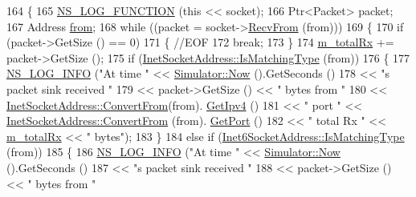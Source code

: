 \begin{DoxyCode}
164 \{
165   \hyperlink{log-macros-disabled_8h_a90b90d5bad1f39cb1b64923ea94c0761}{NS\_LOG\_FUNCTION} (\textcolor{keyword}{this} << socket);
166   Ptr<Packet> packet;
167   Address \hyperlink{lte__amc_8m_a1b4c81ff74eb1a626b5ade44c81004b3}{from};
168   \textcolor{keywordflow}{while} ((packet = socket->\hyperlink{classns3_1_1Socket_af22378d7af9a2745a9eada20210da215}{RecvFrom} (from)))
169     \{
170       \textcolor{keywordflow}{if} (packet->GetSize () == 0)
171         \{ \textcolor{comment}{//EOF}
172           \textcolor{keywordflow}{break};
173         \}
174       \hyperlink{classns3_1_1PacketSink_aa0e0c557f09ac820ca13b5a500600bd1}{m\_totalRx} += packet->GetSize ();
175       \textcolor{keywordflow}{if} (\hyperlink{classns3_1_1InetSocketAddress_a9426766e34e928ce5dbdbeb9563a10df}{InetSocketAddress::IsMatchingType} (from))
176         \{
177           \hyperlink{group__logging_gafbd73ee2cf9f26b319f49086d8e860fb}{NS\_LOG\_INFO} (\textcolor{stringliteral}{"At time "} << \hyperlink{classns3_1_1Simulator_ac3178fa975b419f7875e7105be122800}{Simulator::Now} ().GetSeconds ()
178                        << \textcolor{stringliteral}{"s packet sink received "}
179                        <<  packet->GetSize () << \textcolor{stringliteral}{" bytes from "}
180                        << \hyperlink{classns3_1_1InetSocketAddress_ade776b1109e7b9a7be0b22ced49931e3}{InetSocketAddress::ConvertFrom}(from).
      \hyperlink{classns3_1_1InetSocketAddress_a925d5288448467062884ce0363a63658}{GetIpv4} ()
181                        << \textcolor{stringliteral}{" port "} << \hyperlink{classns3_1_1InetSocketAddress_ade776b1109e7b9a7be0b22ced49931e3}{InetSocketAddress::ConvertFrom} (from).
      \hyperlink{classns3_1_1InetSocketAddress_ac1d62cfd1075b36df273b382c5bd3e14}{GetPort} ()
182                        << \textcolor{stringliteral}{" total Rx "} << \hyperlink{classns3_1_1PacketSink_aa0e0c557f09ac820ca13b5a500600bd1}{m\_totalRx} << \textcolor{stringliteral}{" bytes"});
183         \}
184       \textcolor{keywordflow}{else} \textcolor{keywordflow}{if} (\hyperlink{classns3_1_1Inet6SocketAddress_a4d928c54affbfb530a12076d6d7e0540}{Inet6SocketAddress::IsMatchingType} (from))
185         \{
186           \hyperlink{group__logging_gafbd73ee2cf9f26b319f49086d8e860fb}{NS\_LOG\_INFO} (\textcolor{stringliteral}{"At time "} << \hyperlink{classns3_1_1Simulator_ac3178fa975b419f7875e7105be122800}{Simulator::Now} ().GetSeconds ()
187                        << \textcolor{stringliteral}{"s packet sink received "}
188                        <<  packet->GetSize () << \textcolor{stringliteral}{" bytes from "}

\end{DoxyCode}
